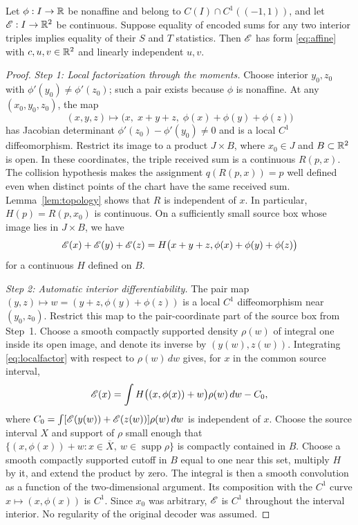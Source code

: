 \begin{lemma}
\label{lem:affine}
Let $\phi:I\to\mathbb R$ be nonaffine and belong to $C(I)\cap C^1((-1,1))$, and let $\mathscr E:I\to\mathbb R^2$ be continuous. Suppose equality of encoded sums for any two interior triples implies equality of their $S$ and $T$ statistics. Then $\mathscr E$ has form \eqref{eq:affine} with $c,u,v\in\mathbb R^2$ and linearly independent $u,v$.
\end{lemma}
\begin{proof}
\emph{Step 1: Local factorization through the moments.}
Choose interior $y_0,z_0$ with $\phi'(y_0)\ne\phi'(z_0)$; such a pair exists because $\phi$ is nonaffine. At any $(x_0,y_0,z_0)$, the map
$$
 (x,y,z)\longmapsto
 \bigl(x,\;x+y+z,\;\phi(x)+\phi(y)+\phi(z)\bigr)
$$
has Jacobian determinant $\phi'(z_0)-\phi'(y_0)\ne0$ and is a local $C^1$ diffeomorphism. Restrict its image to a product $J\times B$, where $x_0\in J$ and $B\subset\mathbb R^2$ is open. In these coordinates, the triple received sum is a continuous $R(p,x)$. The collision hypothesis makes the assignment $q(R(p,x))=p$ well defined even when distinct points of the chart have the same received sum. Lemma~\ref{lem:topology} shows that $R$ is independent of $x$. In particular, $H(p)=R(p,x_0)$ is continuous. On a sufficiently small source box whose image lies in $J\times B$, we have
\begin{equation}
 \mathscr E(x)+\mathscr E(y)+\mathscr E(z)
 =H\bigl(x+y+z,\phi(x)+\phi(y)+\phi(z)\bigr)
 \label{eq:localfactor}
\end{equation}
for a continuous $H$ defined on $B$.

\emph{Step 2: Automatic interior differentiability.}
The pair map $(y,z)\mapsto w=(y+z,\phi(y)+\phi(z))$ is a local $C^1$ diffeomorphism near $(y_0,z_0)$. Restrict this map to the pair-coordinate part of the source box from Step~1. Choose a smooth compactly supported density $\rho(w)$ of integral one inside its open image, and denote its inverse by $(y(w),z(w))$. Integrating \eqref{eq:localfactor} with respect to $\rho(w)\,dw$ gives, for $x$ in the common source interval,
$$
 \mathscr E(x)=\int H\bigl((x,\phi(x))+w\bigr)\rho(w)\,dw-C_0,
$$
where $C_0=\int[\mathscr E(y(w))+\mathscr E(z(w))]\rho(w)\,dw$ is independent of $x$. Choose the source interval $X$ and support of $\rho$ small enough that $\{(x,\phi(x))+w:x\in\overline X,\ w\in\operatorname{supp}\rho\}$ is compactly contained in $B$. Choose a smooth compactly supported cutoff in $B$ equal to one near this set, multiply $H$ by it, and extend the product by zero. The integral is then a smooth convolution as a function of the two-dimensional argument. Its composition with the $C^1$ curve $x\mapsto(x,\phi(x))$ is $C^1$. Since $x_0$ was arbitrary, $\mathscr E$ is $C^1$ throughout the interval interior. No regularity of the original decoder was assumed.


\end{proof}
